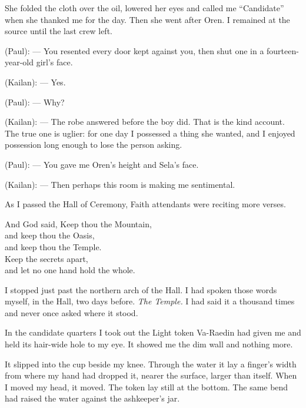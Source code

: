 She folded the cloth over the oil, lowered her eyes and called me ``Candidate'' when she thanked me for the day. Then she went after Oren. I remained at the source until the last crew left.\par

\begin{room}

(Paul): --- You resented every door kept against you, then shut one in a fourteen-year-old girl's face.

(Kailan): --- Yes.

(Paul): --- Why?

(Kailan): --- The robe answered before the boy did. That is the kind account. The true one is uglier: for one day I possessed a thing she wanted, and I enjoyed possession long enough to lose the person asking.

(Paul): --- You gave me Oren's height and Sela's face.

(Kailan): --- Then perhaps this room is making me sentimental.

\end{room}

As I passed the Hall of Ceremony, Faith attendants were reciting more verses.

\begin{scripture}
And God said, Keep thou the Mountain, \\
and keep thou the Oasis, \\
and keep thou the Temple. \\
Keep the secrets apart, \\
and let no one hand hold the whole.
\end{scripture}

I stopped just past the northern arch of the Hall. I had spoken those words myself, in the Hall, two days before. \textit{The Temple.} I had said it a thousand times and never once asked where it stood. \par

\ornament

In the candidate quarters I took out the Light token Va-Raedin had given me and held its hair-wide hole to my eye. It showed me the dim wall and nothing more.\par

It slipped into the cup beside my knee. Through the water it lay a finger's width from where my hand had dropped it, nearer the surface, larger than itself. When I moved my head, it moved. The token lay still at the bottom. The same bend had raised the water against the ashkeeper's jar.\par

